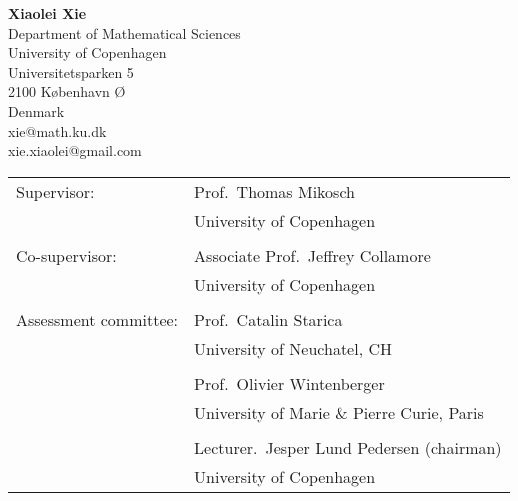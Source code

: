 



%

\frontmatter


\newpage
\leavevmode\thispagestyle{empty} 

\hspace*{0.5cm}  {\bf Xiaolei Xie}\\
\hspace*{1.5cm} Department of Mathematical Sciences\\
\hspace*{1.5cm} University of Copenhagen\\
\hspace*{1.5cm} Universitetsparken 5\\
\hspace*{1.5cm} 2100 København Ø\\
\hspace*{1.5cm} Denmark\\
\hspace*{1.5cm} xie@math.ku.dk\\
\hspace*{1.5cm} xie.xiaolei@gmail.com

\vspace*{3cm}

\begin{tabular}{ll}
Supervisor: & Prof.~Thomas Mikosch\\
& University of Copenhagen\\
& \\
Co-supervisor: & Associate Prof.~Jeffrey Collamore\\
& University of Copenhagen\\
& \\
Assessment committee: &  Prof.~Catalin Starica\\
& University of Neuchatel, CH\\
& \\

& Prof.~Olivier Wintenberger\\
& University of Marie \& Pierre Curie, Paris\\
& \\

& Lecturer.~Jesper Lund Pedersen (chairman)\\
& University of Copenhagen\\
\end{tabular}

